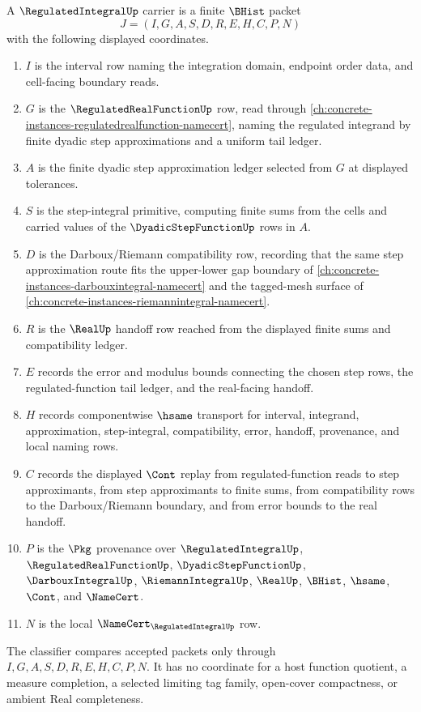 \begin{definition}
\label{def:regulated-integral-namecert-surface}
A $\RegulatedIntegralUp$ carrier is a finite $\BHist$ packet
$$
J=(I,G,A,S,D,R,E,H,C,P,N)
$$
with the following displayed coordinates.
\begin{enumerate}
\item $I$ is the interval row naming the integration domain, endpoint order data, and cell-facing boundary reads.
\item $G$ is the $\RegulatedRealFunctionUp$ row, read through \autoref{ch:concrete-instances-regulatedrealfunction-namecert}, naming the regulated integrand by finite dyadic step approximations and a uniform tail ledger.
\item $A$ is the finite dyadic step approximation ledger selected from $G$ at displayed tolerances.
\item $S$ is the step-integral primitive, computing finite sums from the cells and carried values of the $\DyadicStepFunctionUp$ rows in $A$.
\item $D$ is the Darboux/Riemann compatibility row, recording that the same step approximation route fits the upper-lower gap boundary of \autoref{ch:concrete-instances-darbouxintegral-namecert} and the tagged-mesh surface of \autoref{ch:concrete-instances-riemannintegral-namecert}.
\item $R$ is the $\RealUp$ handoff row reached from the displayed finite sums and compatibility ledger.
\item $E$ records the error and modulus bounds connecting the chosen step rows, the regulated-function tail ledger, and the real-facing handoff.
\item $H$ records componentwise $\hsame$ transport for interval, integrand, approximation, step-integral, compatibility, error, handoff, provenance, and local naming rows.
\item $C$ records the displayed $\Cont$ replay from regulated-function reads to step approximants, from step approximants to finite sums, from compatibility rows to the Darboux/Riemann boundary, and from error bounds to the real handoff.
\item $P$ is the $\Pkg$ provenance over $\RegulatedIntegralUp$, $\RegulatedRealFunctionUp$, $\DyadicStepFunctionUp$, $\DarbouxIntegralUp$, $\RiemannIntegralUp$, $\RealUp$, $\BHist$, $\hsame$, $\Cont$, and $\NameCert$.
\item $N$ is the local $\NameCert_{\RegulatedIntegralUp}$ row.
\end{enumerate}
The classifier compares accepted packets only through $I,G,A,S,D,R,E,H,C,P,N$. It has no coordinate for a host function quotient, a measure completion, a selected limiting tag family, open-cover compactness, or ambient Real completeness.
\end{definition}

